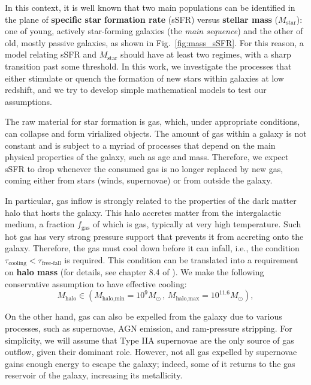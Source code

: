 \documentclass[fleqn,usenatbib]{mnras}
\begin{document}
In this context, it is well known \citep[e.g.,][]{Kauffmann_2003} that two main populations can be identified in the plane of \textbf{specific star formation rate} (sSFR) versus \textbf{stellar mass} ($M_{\text{star}}$): one of young, actively star-forming galaxies (the \textit{main sequence}) and the other of old, mostly passive galaxies, as shown in Fig.~\ref{fig:mass_sSFR}. For this reason, a model relating sSFR and $M_{\text{star}}$ should have at least two regimes, with a sharp transition past some threshold. In this work, we investigate the processes that either stimulate or quench the formation of new stars within galaxies at low redshift, and we try to develop simple mathematical models to test our assumptions.

The raw material for star formation is gas, which, under appropriate conditions, can collapse and form virialized objects. The amount of gas within a galaxy is not constant and is subject to a myriad of processes that depend on the main physical properties of the galaxy, such as age and mass. Therefore, we expect sSFR to drop whenever the consumed gas is no longer replaced by new gas, coming either from stars (winds, supernovae) or from outside the galaxy. 

In particular, gas inflow is strongly related to the properties of the dark matter halo that hosts the galaxy. This halo accretes matter from the intergalactic medium, a fraction $f_{\text{gas}}$ of which is gas, typically at very high temperature. Such hot gas has very strong pressure support that prevents it from accreting onto the galaxy. Therefore, the gas must cool down before it can infall, i.e., the condition $\tau_{\text{cooling}} < \tau_{\text{free-fall}}$ is required. This condition can be translated into a requirement on \textbf{halo mass} (for details, see chapter 8.4 of \citet{galaxy_formation_and_evolution_2010}). We make the following conservative assumption to have effective cooling:
\begin{equation}
    M_{\text{halo}} \in \left( M_{\text{halo,min}}=10^9 M_\odot \, , \, M_{\text{halo,max}}=10^{11.6} M_\odot \right),
	\label{eq:halo_mass_minmax}
\end{equation}

On the other hand, gas can also be expelled from the galaxy due to various processes, such as supernovae, AGN emission, and ram-pressure stripping. For simplicity, we will assume that Type IIA supernovae are the only source of gas outflow, given their dominant role. However, not all gas expelled by supernovae gains enough energy to escape the galaxy; indeed, some of it returns to the gas reservoir of the galaxy, increasing its metallicity. 
\end{document}
